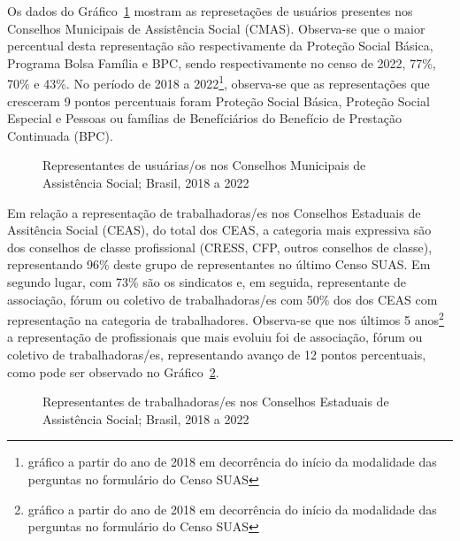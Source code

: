 \documentclass[
  letterpaper,
  DIV=11,
  numbers=noendperiod]{scrreprt}
\begin{document}
Os dados do Gráfico~\ref{fig-usu_cmun} mostram as represetações de
usuários presentes nos Conselhos Municipais de Assistência Social
(CMAS). Observa-se que o maior percentual desta representação são
respectivamente da Proteção Social Básica, Programa Bolsa Família e BPC,
sendo respectivamente no censo de 2022, 77\%, 70\% e 43\%. No período de
2018 a 2022\footnote{gráfico a partir do ano de 2018 em decorrência do
  início da modalidade das perguntas no formulário do Censo SUAS},
observa-se que as representações que cresceram 9 pontos percentuais
foram Proteção Social Básica, Proteção Social Especial e Pessoas ou
famílias de Benefíciários do Benefício de Prestação Continuada (BPC).

\begin{figure}


\caption{\label{fig-usu_cmun}Representantes de usuárias/os nos Conselhos
Municipais de Assistência Social; Brasil, 2018 a 2022}

\end{figure}%

Em relação a representação de trabalhadoras/es nos Conselhos Estaduais
de Assitência Social (CEAS), do total dos CEAS, a categoria mais
expressiva são dos conselhos de classe profissional (CRESS, CFP, outros
conselhos de classe), representando 96\% deste grupo de representantes
no último Censo SUAS. Em segundo lugar, com 73\% são os sindicatos e, em
seguida, representante de associação, fórum ou coletivo de
trabalhadoras/es com 50\% dos dos CEAS com representação na categoria de
trabalhadores. Observa-se que nos últimos 5 anos\footnote{gráfico a
  partir do ano de 2018 em decorrência do início da modalidade das
  perguntas no formulário do Censo SUAS} a representação de
profissionais que mais evoluiu foi de associação, fórum ou coletivo de
trabalhadoras/es, representando avanço de 12 pontos percentuais, como
pode ser observado no Gráfico~\ref{fig-trab_rep}.

\begin{figure}


\caption{\label{fig-trab_rep}Representantes de trabalhadoras/es nos
Conselhos Estaduais de Assistência Social; Brasil, 2018 a 2022}

\end{figure}%
\end{document}
